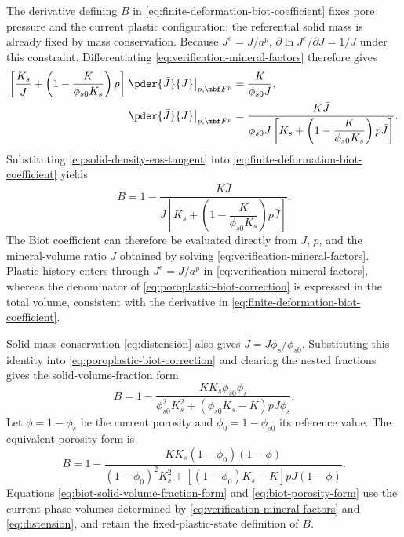 The derivative defining \(B\) in \eqref{eq:finite-deformation-biot-coefficient}
fixes pore pressure and the current plastic configuration; the referential
solid mass is already fixed by mass conservation.  Because \(J^e=J/a^p\),
\(\partial\ln J^e/\partial J=1/J\) under this constraint.
Differentiating \eqref{eq:verification-mineral-factors} therefore gives
\begin{align}
 \left[\frac{K_s}{\bar J}
 +\left(1-\frac{K}{\phi_{s0}K_s}\right)p\right]
 \left.\pder{\bar J}{J}\right|_{p,\mbf F^p}
 &=\frac{K}{\phi_{s0}J},
 \notag
\\
 \left.\pder{\bar J}{J}\right|_{p,\mbf F^p}
 &=\frac{K\bar J}
 {\phi_{s0}J\left[K_s+\left(1-\dfrac{K}{\phi_{s0}K_s}\right)p\bar J\right]}.
 \label{eq:solid-density-eos-tangent}
\end{align}
Substituting \eqref{eq:solid-density-eos-tangent} into
\eqref{eq:finite-deformation-biot-coefficient} yields
\begin{equation}
 \boxed{B=1-\frac{K\bar J}
 {J\left[K_s+\left(1-\dfrac{K}{\phi_{s0}K_s}\right)p\bar J\right]}.}
 \label{eq:poroplastic-biot-correction}
\end{equation}
The Biot coefficient can therefore be evaluated directly from \(J\), \(p\),
and the mineral-volume ratio \(\bar J\) obtained by solving
\eqref{eq:verification-mineral-factors}.
Plastic history enters through
\(J^e=J/a^p\) in \eqref{eq:verification-mineral-factors}, whereas the
denominator of \eqref{eq:poroplastic-biot-correction} is expressed in the
total volume, consistent with the derivative in
\eqref{eq:finite-deformation-biot-coefficient}.

Solid mass conservation \eqref{eq:distension} also gives \(\bar J=J\phi_s/\phi_{s0}\).
Substituting this identity into \eqref{eq:poroplastic-biot-correction}
and clearing the nested fractions gives the solid-volume-fraction form
\begin{equation}
 B=1-\frac{KK_s\phi_{s0}\phi_s}
 {\phi_{s0}^2K_s^2+(\phi_{s0}K_s-K)pJ\phi_s}.
 \label{eq:biot-solid-volume-fraction-form}
\end{equation}
Let \(\phi=1-\phi_s\) be the current porosity and
\(\phi_0=1-\phi_{s0}\) its reference value.  The equivalent porosity form is
\begin{equation}
 B=1-\frac{KK_s(1-\phi_0)(1-\phi)}
 {(1-\phi_0)^2K_s^2+\left[(1-\phi_0)K_s-K\right]pJ(1-\phi)}.
 \label{eq:biot-porosity-form}
\end{equation}
Equations \eqref{eq:biot-solid-volume-fraction-form} and
\eqref{eq:biot-porosity-form} use the current phase volumes determined by
\eqref{eq:verification-mineral-factors} and \eqref{eq:distension}, and retain
the fixed-plastic-state definition of \(B\).

